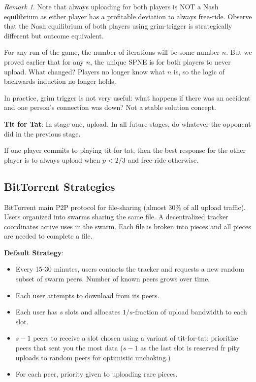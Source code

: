 \documentclass[dvipsnames]{article}
\theoremstyle{definition}
\theoremstyle{remark}
\newtheorem*{remark}{Remark}
\begin{document}
\begin{remark}
	Note that always uploading for both players is NOT a Nash equilibrium as either player has a profitable deviation to always free-ride. Observe that the Nash equilibrium of both players using grim-trigger is strategically different but outcome equivalent. 
\end{remark}

For any run of the game, the number of iterations will be some number $n$. But we proved earlier that for any $n$, the unique SPNE is for both players to never upload. What changed? Players no longer know what $n$ is, so the logic of backwards induction no longer holds.

In practice, grim trigger is not very useful: what happens if there was an accident and one person's connection was down? Not a stable solution concept.

\textbf{Tit for Tat}: In stage one, upload. In all future stages, do whatever the opponent did in the previous stage.

If one player commits to playing tit for tat, then the best response for the other player is to always upload when $p < 2/3$ and free-ride otherwise. 

\subsection{BitTorrent Strategies}

BitTorrent main P2P protocol for file-sharing (almost 30\% of all upload traffic). Users organized into swarms sharing the same file. A decentralized tracker coordinates active uses in the swarm. Each file is broken into pieces and all pieces are needed to complete a file.

\textbf{Default Strategy}:
\begin{itemize}
	\item Every 15-30 minutes, users contacts the tracker and requests a new random subset of swarm peers. Number of known peers grows over time. 
	\item Each user attempts to download from its peers.
	\item Each user has $s$ slots and allocates $1/s$-fraction of upload bandwidth to each slot.
	\item $s-1$ peers to receive a slot chosen using a variant of tit-for-tat: prioritize peers that sent you the most data ($s-1$ as the last slot is reserved fr pity uploads to random peers for optimistic unchoking.)
	\item For each peer, priority given to uploading rare pieces. 
\end{itemize} 
\end{document}
